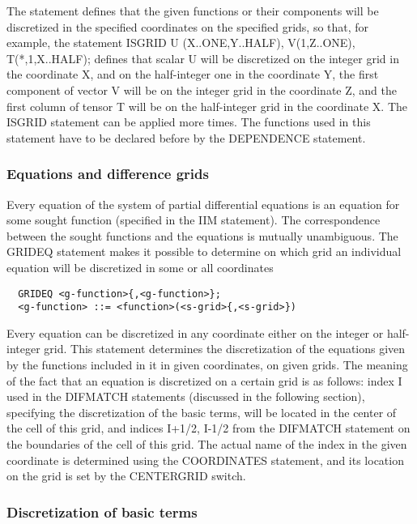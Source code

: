 The statement  defines that the given functions or their components will
be discretized in the specified coordinates  on the  specified grids, so
that, for example, the statement ISGRID U (X..ONE,Y..HALF), V(1,Z..ONE),
T(*,1,X..HALF); defines that scalar U will be discretized on the integer
grid in  the coordinate X, and on the half-integer one in the coordinate
Y, the first component of vector V will  be on  the integer  grid in the
coordinate  Z,  and  the  first  column  of  tensor  T  will  be  on the
half-integer grid in the  coordinate  X.  The  ISGRID  statement  can be
applied  more  times.  The  functions  used in this statement have to be
declared before by the DEPENDENCE statement.


\subsubsection{Equations and difference grids}


     Every equation of the system of  partial differential  equations is
an equation  for some  sought function (specified in the IIM statement).
The correspondence between the sought  functions  and  the  equations is
mutually  unambiguous.   The  GRIDEQ  statement  makes  it  possible  to
determine on which grid  an individual  equation will  be discretized in
some or all coordinates
\begin{verbatim}
  GRIDEQ <g-function>{,<g-function>};
  <g-function> ::= <function>(<s-grid>{,<s-grid>})
\end{verbatim}
Every  equation  can  be  discretized  in  any  coordinate either on the
integer   or   half-integer   grid.   This   statement   determines  the
discretization of the equations given by the functions included in it in
given coordinates, on given grids.  The  meaning  of  the  fact  that an
equation is discretized on a certain grid is as follows: index I used in
the DIFMATCH statements (discussed in the following section), specifying
the discretization  of the basic terms, will be located in the center of
the cell of this  grid,  and  indices  I+1/2,  I-1/2  from  the DIFMATCH
statement on the boundaries of the cell of this grid. The actual name of
the index in the  given coordinate  is determined  using the COORDINATES
statement, and its location on the grid is set by the CENTERGRID switch.




\subsubsection{Discretization of basic terms}

